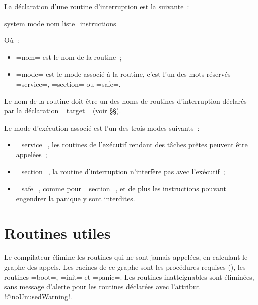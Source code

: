
La déclaration d'une routine d'interruption est la suivante~:
\begin{OMNIBUS}
system mode nom {
  liste_instructions
}
\end{OMNIBUS}
Où~:
\begin{itemize}
  \item \omnibus=nom= est le nom de la routine~;
  \item \omnibus=mode= est le mode associé à la routine, c'est l'un des mots réservés \omnibus=service=, \omnibus=section= ou \omnibus=safe=.
\end{itemize}

Le nom de la routine doit être un des noms de routines d'interruption déclarés par la déclaration \omnibus=target= (voir §§).

Le mode d'exécution associé est l'un des trois modes suivants~:
\begin{itemize}
  \item \omnibus=service=, les routines de l'exécutif rendant des tâches prêtes peuvent être appelées~;
  \item \omnibus=section=, la routine d'interruption n'interfère pas avec l'exécutif~;
  \item \omnibus=safe=, comme pour \omnibus=section=, et de plus les instructions pouvant engendrer la panique y sont interdites.
\end{itemize}









\section{Routines utiles}

Le compilateur élimine les routines qui ne sont jamais appelées, en calculant le graphe des appels. Les racines de ce graphe sont les procédures requises (), les routines \omnibus=boot=, \omnibus=init= et \omnibus=panic=. Les routines inatteignables sont éliminées, sans message d'alerte pour les routines déclarées avec l'attribut \omnibus!@noUnusedWarning!.











